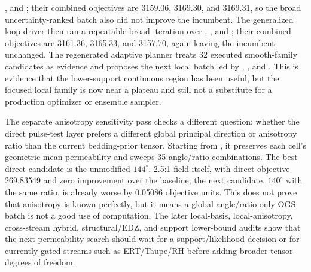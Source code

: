 , and ; their combined
objectives are 3159.06, 3169.30, and 3169.31, so the broad uncertainty-ranked batch
also did not improve the incumbent.  The generalized loop driver then ran a repeatable
broad iteration over , , and
; their combined objectives are 3161.36, 3165.33, and 3157.70,
again leaving the incumbent unchanged.  The regenerated adaptive planner treats 32
executed smooth-family candidates as evidence and proposes the next
local batch led by ,
, and .  This is
evidence that the lower-support continuous region has been useful, but the focused
local family is now near a plateau and still not a substitute for a production
optimizer or ensemble sampler.

The separate anisotropy sensitivity pass
 checks a different question: whether the
direct pulse-test layer prefers a different global principal direction or anisotropy
ratio than the current bedding-prior tensor.  Starting from
, it preserves each cell's geometric-mean
permeability and sweeps 35 angle/ratio combinations.  The best direct candidate is
the unmodified \(144^\circ\), 2.5:1 field itself, with direct objective 269.83549 and
zero improvement over the baseline; the next candidate, \(140^\circ\) with the same
ratio, is already worse by 0.05086 objective units.  This does not prove that
anisotropy is known perfectly, but it means a global angle/ratio-only OGS batch is
not a good use of computation.  The later local-basis, local-anisotropy,
cross-stream hybrid, structural/EDZ, and support lower-bound audits show that the
next permeability search should wait for a support/likelihood decision or for
currently gated streams such as ERT/Taupe/RH before adding broader tensor degrees of
freedom.

